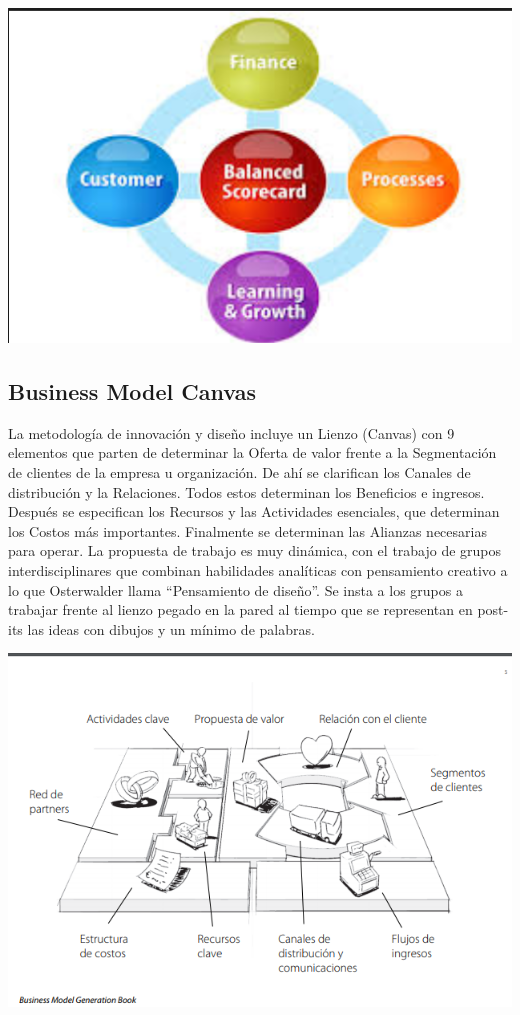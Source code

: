 \begin{center}
\includegraphics{images/BS/imagen.png}\newline
\end{center}

\subsection{Business Model Canvas}

La metodología de innovación y diseño incluye un Lienzo (Canvas) con 9 elementos que parten de determinar la Oferta de valor frente a la Segmentación de clientes de la empresa u organización. De ahí se clarifican los Canales de distribución y la Relaciones. Todos estos determinan los Beneficios e ingresos. Después se especifican los Recursos y las Actividades esenciales, que determinan los Costos más importantes. Finalmente se determinan las Alianzas necesarias para operar. La propuesta de trabajo es muy dinámica, con el trabajo de grupos interdisciplinares que combinan habilidades analíticas con pensamiento creativo a lo que Osterwalder llama “Pensamiento de diseño”. Se insta a los grupos a trabajar frente al lienzo pegado en la pared al tiempo que se representan en post-its las ideas con dibujos y un mínimo de palabras.\newline

\begin{center}
\includegraphics{images/BS/imagen2.png}\newline
\end{center}



